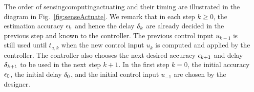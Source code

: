 The order of sensing\textendash{}computing\textendash{}actuating and
their timing are illustrated in the diagram in Fig.~\ref{fig:senseActuate}.
We remark that in each step $k\geq0$, the estimation accuracy $\epsilon_k$
and hence the delay $\delta_k$ are already decided in the previous
step and known to the controller. 
The previous control input $u_{k-1}$
is still used until $t_{a,k}$ when the new control input $u_{k}$
is computed and applied by the controller. 
The controller also chooses
the next desired accuracy $\epsilon_{k+1}$ and delay $\delta_{k+1}$
to be used in the next step $k+1$. 
In the first step $k=0$, the
initial accuracy $\epsilon_0$, the initial delay $\delta_0$, and
the initial control input $u_{-1}$ are chosen by the designer.







